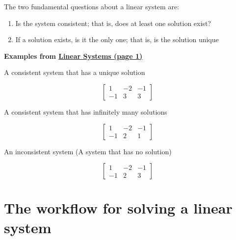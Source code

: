\documentclass[
  letterpaper,
  DIV=11,
  numbers=noendperiod]{scrreprt}
\providecommand{\tightlist}{%
  \setlength{\itemsep}{0pt}\setlength{\parskip}{0pt}}\usepackage{longtable,booktabs,array}
\begin{document}
\begin{tcolorbox}[enhanced jigsaw, colbacktitle=quarto-callout-note-color!10!white, toprule=.15mm, colback=white, breakable, titlerule=0mm, leftrule=.75mm, bottomtitle=1mm, opacitybacktitle=0.6, bottomrule=.15mm, title=\textcolor{quarto-callout-note-color}{\faInfo}\hspace{0.5em}{Existence and Uniqueness Question}, left=2mm, colframe=quarto-callout-note-color-frame, rightrule=.15mm, toptitle=1mm, opacityback=0, arc=.35mm, coltitle=black]

The two fundamental questions about a linear system are:

\begin{enumerate}
\def\labelenumi{\arabic{enumi}.}
\tightlist
\item
  Is the system consistent; that is, does at least one solution exist?
\item
  If a solution exists, is it the only one; that is, is the solution
  unique
\end{enumerate}

\textbf{Examples from \href{./p1.html}{Linear Systems (page 1)}}

A consistent system that has a unique solution

\[
\left[\begin{array}{cc|c}
1 & -2 & -1 \\
-1 & 3 & 3
\end{array}\right]
\]

A consistent system that has infinitely many solutions

\[
\left[\begin{array}{cc|c}
1 & -2 & -1 \\
-1 & 2 & 1
\end{array}\right]  
\]

An inconsistent system (A system that has no solution)

\[
\left[\begin{array}{cc|c}
1 & -2 & -1 \\
-1 & 2 & 3
\end{array}\right]
\]

\end{tcolorbox}

\hypertarget{the-workflow-for-solving-a-linear-system}{%
\section*{The workflow for solving a linear
system}\label{the-workflow-for-solving-a-linear-system}}
\end{document}
